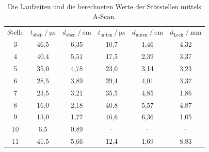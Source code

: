 \begin{table}[H]
  \centering
  \caption{Die Laufzeiten und die berechneten Werte der Störstellen mittels A-Scan.}
  \label{tab:tiefenmessung}
  \begin{tabular}{c c c c c c}
    \toprule
    \multicolumn{1}{c}{Stelle} &
    \multicolumn{1}{c}{$t_\text{oben} \mathbin{/} \unit{\micro\second}$} &
    \multicolumn{1}{c}{$d_\text{oben} \mathbin{/} \unit{\centi\meter}$} &
    \multicolumn{1}{c}{$t_\text{unten} \mathbin{/} \unit{\micro\second}$} &
    \multicolumn{1}{c}{$d_\text{unten} \mathbin{/} \unit{\centi\meter}$} &
    \multicolumn{1}{c}{$d_\text{Loch} \mathbin{/} \unit{\milli\meter}$} \\

    \cmidrule(lr){1-1} \cmidrule(lr){2-3} \cmidrule(lr){4-5} \cmidrule(lr){6-6} 
    
          3 &    46,5 &    6,35 &     10,7 &     1,46 &    4,32 \\
          4 &    40,4 &    5,51 &     17,5 &     2,39 &    3,37 \\
          5 &    35,0 &    4,78 &     23,0 &     3,14 &    3,23 \\
          6 &    28,5 &    3,89 &     29,4 &     4,01 &    3,37 \\
          7 &    23,5 &    3,21 &     35,5 &     4,85 &    1,86 \\
          8 &    16,0 &    2,18 &     40,8 &     5,57 &    4,87 \\
          9 &    13,0 &    1,77 &     46,6 &     6,36 &    1,05 \\
         10 &     6,5 &    0,89 &        - &        - &       - \\
         11 &    41,5 &    5,66 &     12,4 &     1,69 &    8,83 \\
    \bottomrule
  \end{tabular}
\end{table}

